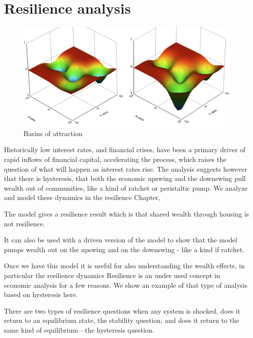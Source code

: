 \chapter{Resilience analysis}


\begin{figure}
\centering
\includegraphics{fig/basins.png}
\caption{Basins of attraction}
\label{fig-basins}
\end{figure}

Historically low interest rates, and financial crises, have been a primary driver of rapid inflows of financial capital, accelerating the process, which raises the question of what will happen as interest rates rise. The analysis suggests however that there is hysteresis, that both the economic upswing and the downswing pull wealth out of communities, like a kind of ratchet or peristaltic pump. We analyze and model these dynamics in the resilience Chapter, %

The model gives a resilience result which is that shared wealth through housing is not resilience.

It can also be used with a driven version of the model to show that the model pumps wealth out on the upswing and on the downswing - like a kind if ratchet.


Once we have this model it is useful for also understanding the wealth effects, in particular the resilience dynamics
Resilience is an under used concept in economic analysis for a few reasons. We show an example of that type of analysis based on hysteresis here. 


There are two types of resilience questions when any system is shocked, does it return to an equilibrium state, the stability question, and does it return to the same kind of equilibrium---the hysteresis question. %

